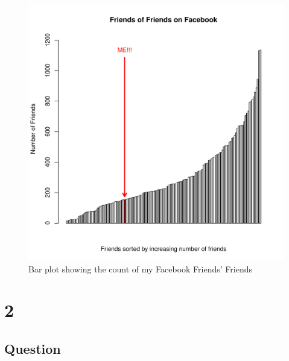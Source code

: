 \documentclass[letterpaper,11pt]{article}
\begin{document}
\clearpage
\begin{figure}[h]
\includegraphics[scale=0.7]{q1/q1-barplot.pdf}
\caption{Bar plot showing the count of my Facebook Friends' Friends}
\label{fig:q1barplot}
\end{figure}

\newpage


\newpage



\newpage
\section*{2}

\subsection*{Question}
\end{document}
